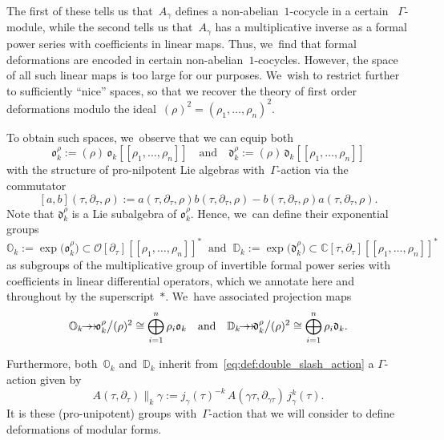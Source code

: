 \documentclass[JEP,XML,SOM,Unicode,published]{cedram}
\newcommand{\onto}{\mathchoice{\to\hspace*{-5mm}\to}{\mathrel{\hbox{$\to\hspace*{-2.85mm}\to$}}}{\to\hspace*{-3mm}\to}{\to\hspace*{-3mm}\to}}
\theoremstyle{plain}
\theoremstyle{definition}
\newcommand{\tx}{\text}
\newcommand{\nbd}{\nobreakdash-\hspace{0pt}}
\newcommand{\bbC}{\ensuremath{\mathbb{C}}}
\newcommand{\bbD}{\ensuremath{\mathbb{D}}}
\newcommand{\bbO}{\ensuremath{\mathbb{O}}}
\newcommand{\cO}{\ensuremath{\mathcal{O}}}
\newcommand{\frakd}{\ensuremath{\mathfrak{d}}}
\newcommand{\frako}{\ensuremath{\mathfrak{o}}}
\newcommand{\defeq}{:=}
\newcommand{\llbrkt}{[\![}
\newcommand{\rrbrkt}{]\!]}
\let\Ga\Gamma
\let\ga\gamma
\begin{document}
The first of these tells us that~$A_\ga$ defines a non-abelian~$1$-cocycle in a certain ~$\Ga$\nbd{}module, while the second tells us that~$A_\ga$ has a multiplicative inverse as a formal power series with coefficients in linear maps. Thus, we~find that formal deformations are encoded in certain non-abelian~$1$-cocycles. However, the space of all such linear maps is too large for our purposes. We~wish to restrict further to sufficiently ``nice'' spaces, so that we recover the theory of first order deformations modulo the ideal~$(\rho)^2 = (\rho_1,\ldots,\rho_n)^2$.

To obtain such spaces, we~observe that we can equip both
\begin{equation}
\label{defeq:pronil}
\frako_k^\rho \defeq (\rho)\, \frako_k\llbrkt \rho_1,\ldots,\rho_n\rrbrkt
\quad\tx{and}\quad
\frakd_k^\rho \defeq (\rho)\, \frakd_k\llbrkt \rho_1,\ldots,\rho_n\rrbrkt
\end{equation}
with the structure of pro-nilpotent Lie algebras with~$\Ga$\nbd{}action via the commutator
\[
[a,b](\tau,\partial_\tau,\rho) := a(\tau,\partial_\tau,\rho)b(\tau,\partial_\tau,\rho)- b(\tau,\partial_\tau,\rho)a(\tau,\partial_\tau,\rho).\]
Note that $\frakd_k^\rho$ is a Lie subalgebra of $\frako_k^\rho$. Hence, we~can define their exponential groups
\begin{equation}
\label{defeq:groups_od}
\bbO_k
\!\defeq\!
\exp\bigl(\frako_k^\rho\bigr)
\!\subset\!
\cO[\partial_\tau]\llbrkt \rho_1,\ldots,\rho_n\rrbrkt^\ast
\;\;\tx{and}\;\;
\bbD_k
\!\defeq\!
\exp\bigl(\frakd_k^\rho\bigr)
\!\subset\!
\bbC[\tau,\partial_\tau]\llbrkt \rho_1,\ldots,\rho_n\rrbrkt^\ast
\end{equation}
as subgroups of the multiplicative group of invertible formal power series with coefficients in linear differential operators, which we annotate here and throughout by the superscript~$\ast$. We~have associated projection maps
\begin{equation}
\label{eq:projection_group_od_to_germ}
\bbO_k
\onto
\frako_k^\rho \big\slash (\rho)^2
\cong
\bigoplus_{i = 1}^n \rho_i \frako_k
\quad\tx{and}\quad
\bbD_k
\onto
\frakd_k^\rho \big\slash (\rho)^2
\cong
\bigoplus_{i = 1}^n \rho_i \frakd_k
\tx{.}
\end{equation}

Furthermore, both~$\bbO_k$ and~$\bbD_k$ inherit from~\eqref{eq:def:double_slash_action} a $\Ga$\nbd{}action given by
\begin{equation*}
A(\tau,\partial_\tau)\big\|_k \ga
\defeq
j_\ga(\tau)^{-k}\, A(\ga\tau,\partial_{\ga\tau})\, j_\ga^k(\tau)
\tx{.}
\end{equation*}
It is these (pro-unipotent) groups with~$\Ga$\nbd{}action that we will consider to define deformations of modular forms.
\end{document}
